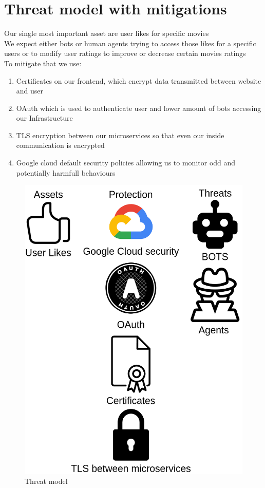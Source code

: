\documentclass{article}[11pt]
\begin{document}
\section{Threat model with mitigations}
Our single most important asset are user likes for specific movies \\ 
We expect either bots or human agents trying to access those likes for a specific users or to modify user ratings to improve or decrease certain movies ratings \\ 
To mitigate that we use: 
\begin{enumerate}
    \item Certificates on our frontend, which encrypt data transmitted between website and user 
    \item OAuth which is used to authenticate user and lower amount of bots accessing our Infrastructure
    \item TLS encryption between our microservices so that even our inside communication is encrypted 
    \item Google cloud default security policies allowing us to monitor odd and potentially harmfull behaviours
\end{enumerate}
\begin{figure}[H]
    \caption{Threat model}
    \centering
\includegraphics[width=\textwidth]{images/threat_model.png}
\end{figure}
\end{document}
